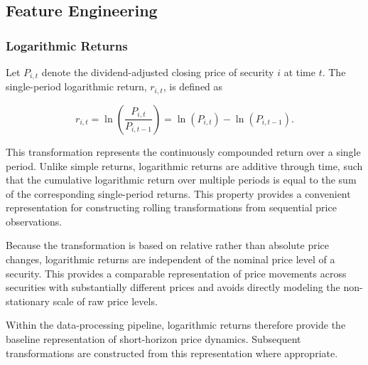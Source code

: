 

\subsection{Feature Engineering}
\label{feature_engineering}
\subsubsection{Logarithmic Returns}
Let $P_{i,t}$ denote the dividend-adjusted closing price of security $i$ at time $t$. The single-period logarithmic return, $r_{i,t}$, is defined as

\begin{equation}
    r_{i,t}
    =
    \ln\left(\frac{P_{i,t}}{P_{i,t-1}}\right)
    =
    \ln(P_{i,t})-\ln(P_{i,t-1}).
\end{equation}

This transformation represents the continuously compounded return over a single period. Unlike simple returns, logarithmic returns are additive through time, such that the cumulative logarithmic return over multiple periods is equal to the sum of the corresponding single-period returns. This property provides a convenient representation for constructing rolling transformations from sequential price observations.

\medskip

Because the transformation is based on relative rather than absolute price changes, logarithmic returns are independent of the nominal price level of a security. This provides a comparable representation of price movements across securities with substantially different prices and avoids directly modeling the non-stationary scale of raw price levels.

\medskip

Within the data-processing pipeline, logarithmic returns therefore provide the baseline representation of short-horizon price dynamics. Subsequent transformations are constructed from this representation where appropriate.

